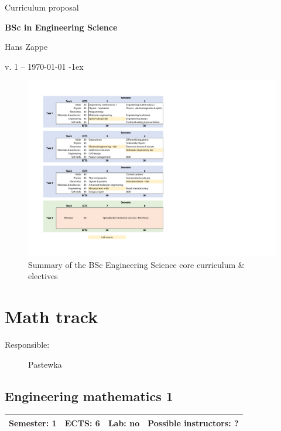 \documentclass[12pt,twoside,fleqn,a4paper]{article}
\begin{document}
\thispagestyle{empty}
\parindent=0mm

\vspace*{10mm}
{\Large Curriculum proposal}
\vspace*{15mm}

{\Large\bf  BSc in Engineering Science}

\vspace*{15mm}
Hans Zappe

\vspace*{15mm}

v. 1 -- \today
\vfill
{\small\parskip-1ex \setcounter{tocdepth}{1}\tableofcontents}~


\newpage
\setlength{\parindent}{1em}
\setlength{\parskip}{0em}
\setcounter{page}{1}

\begin{figure}[h]
\centering
\includegraphics[width=0.9\columnwidth]{CoreCurriculumGraphic}
\caption{Summary of the BSc Engineering Science core curriculum \& electives}
\label{pic:Single}
\end{figure}



\newpage
\section{Math track}
\begin{description}
\item[Responsible:] Pastewka
\end{description}
\vspace{1 mm}


\subsection{Engineering mathematics 1}
\begin{tabular}{llll} \hline
\textbf{Semester:} 1 & \textbf{ECTS:} 6 & \textbf{Lab:} no & \textbf{Possible instructors:} ?\\
\hline
\end{tabular}
\end{document}
